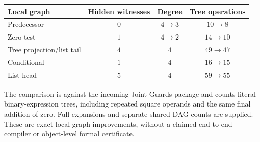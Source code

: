 \begin{center}
\begin{tabular}{lccc}
\hline
Local graph & Hidden witnesses & Degree & Tree operations\\
\hline
Predecessor & $0$ & $4\to3$ & $10\to8$\\
Zero test & $1$ & $4\to2$ & $14\to10$\\
Tree projection/list tail & $4$ & $4$ & $49\to47$\\
Conditional & $1$ & $4$ & $16\to15$\\
List head & $5$ & $4$ & $59\to55$\\
\hline
\end{tabular}
\end{center}

The comparison is against the incoming Joint Guards package and counts
literal binary-expression trees, including repeated square operands and
the same final addition of zero.  Full expansions and separate shared-DAG
counts are supplied.  These are exact local graph improvements, without
a claimed end-to-end compiler or object-level formal certificate.
